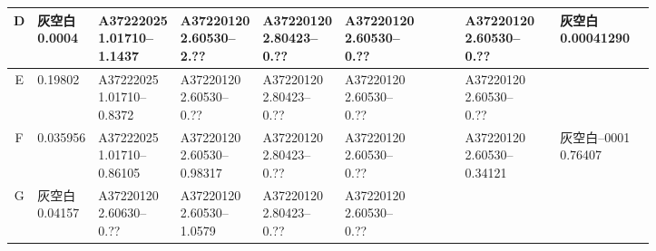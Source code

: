 \documentclass[UTF8,10pt,a4paper,fontset=fandol]{ctexart}
\begin{document}
\begin{center}
\begin{tabular}{c|*{12}{p{0.62cm}|}}
D &
\text{灰空白\\0.0004} &
\text{A37222025\\1.01710--\\1.1437} &
\text{A37220120\\2.60530--\\2.??} &
\text{A37220120\\2.80423--\\0.??} &
\text{A37220120\\2.60530--\\0.??} &
 & & & \text{A37220120\\2.60530--\\0.??} & & \text{灰空白\\0.00041290} & \\ \hline
E &
0.19802 &
\text{A37222025\\1.01710--\\0.8372} &
\text{A37220120\\2.60530--\\0.??} &
\text{A37220120\\2.80423--\\0.??} &
\text{A37220120\\2.60530--\\0.??} &
 & & & \text{A37220120\\2.60530--\\0.??} & & & \\ \hline
F &
0.035956 &
\text{A37222025\\1.01710--\\0.86105} &
\text{A37220120\\2.60530--\\0.98317} &
\text{A37220120\\2.80423--\\0.??} &
\text{A37220120\\2.60530--\\0.??} &
 & & & \text{A37220120\\2.60530--\\0.34121} &
 & \text{灰空白--0001\\0.76407} & \\ \hline
G &
\text{灰空白\\0.04157} &
\text{A37220120\\2.60630--\\0.??} &
\text{A37220120\\2.60530--\\1.0579} &
\text{A37220120\\2.80423--\\0.??} &
\text{A37220120\\2.60530--\\0.??} &

\end{tabular}
\end{center}
\end{document}
